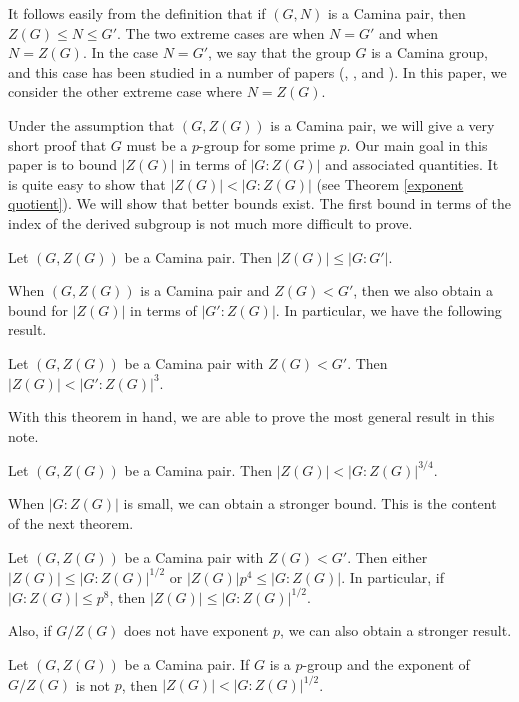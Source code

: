 It follows easily from the definition that if $(G,N)$ is a Camina pair, then $Z(G) \le N \le G'$.  The two extreme cases are when $N = G'$ and when $N = Z (G)$.  In the case $N
= G'$, we say that the group $G$ is a Camina group, and this case has been studied in a number of papers (\cite{DaSc}, \cite{MacD1}, and \cite{more}).  In this paper, we consider the other extreme case where $N = Z (G)$.

Under the assumption that $(G,Z(G))$ is a Camina pair, we will give a very short proof that $G$ must be a $p$-group for some prime $p$.  Our main goal in this paper is to bound $|Z(G)|$ in terms of $|G:Z(G)|$ and associated quantities.  It is quite easy to show that $|Z (G)| < |G: Z(G)|$ (see Theorem \ref{exponent quotient}).  We will show that better bounds exist.  The first bound in terms of the index of the derived subgroup is not much more difficult to prove.

\begin{thm} \label{first}
Let $(G,Z(G))$ be a Camina pair.  Then $|Z(G)| \le |G:G'|$.
\end{thm}

When $(G,Z(G))$ is a Camina pair and $Z (G) < G'$, then we also obtain a bound for $|Z (G)|$ in terms of $|G':Z(G)|$.  In particular, we have the following result.

\begin{thm} \label{second}
Let $(G,Z(G))$ be a Camina pair with $Z(G) < G'$.  Then $|Z (G)| < |G':Z(G)|^3$.
\end{thm}

With this theorem in hand, we are able to prove the most general result in this note.

\begin{thm} \label{third}
Let $(G,Z(G))$ be a Camina pair.  Then $|Z (G)| < |G:Z(G)|^{3/4}$.
\end{thm}

When $|G:Z(G)|$ is small, we can obtain a stronger bound.  This is the content of the next theorem.

\begin{thm} \label{fourth}
Let $(G,Z(G))$ be a Camina pair with $Z (G) < G'$.  Then either $|Z (G)| \le |G:Z(G)|^{1/2}$ or $|Z (G)|p^4 \le |G:Z(G)|$.  In particular, if $|G:Z(G)| \le p^8$, then $|Z (G)| \le |G:Z (G)|^{1/2}$.
\end{thm}

Also, if $G/ Z(G)$ does not have exponent $p$, we can also obtain a stronger result.

\begin{thm} \label{fifth}
Let $(G,Z(G))$ be a Camina pair.  If $G$ is a $p$-group and the exponent of $G/Z (G)$ is not $p$, then $|Z (G)| < |G:Z(G)|^{1/2}$.
\end{thm}

